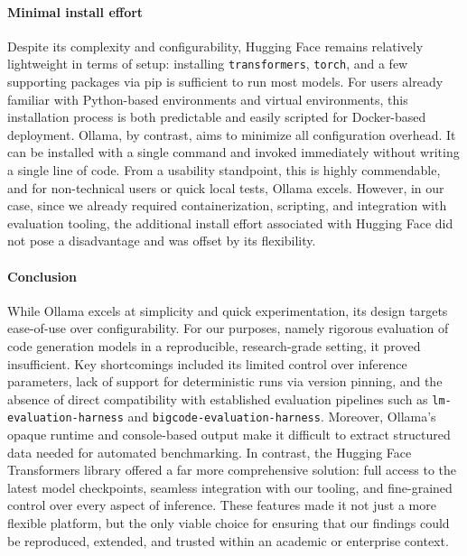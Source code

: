\paragraph{Minimal install effort}
Despite its complexity and configurability, Hugging Face remains relatively light\-weight in terms of setup: installing \texttt{transformers}, \texttt{torch}, and a few supporting packages via pip is sufficient to run most models. For users already familiar with Python-based environments and virtual environments, this installation process is both predictable and easily scripted for Docker-based deployment. Ollama, by contrast, aims to minimize all configuration overhead. It can be installed with a single command and invoked immediately without writing a single line of code. From a usability standpoint, this is highly commendable, and for non-technical users or quick local tests, Ollama excels. However, in our case, since we already required containerization, scripting, and integration with evaluation tooling, the additional install effort associated with Hugging Face did not pose a disadvantage and was offset by its flexibility.

\paragraph{Conclusion}
While Ollama excels at simplicity and quick experimentation, its design targets ease-of-use over configurability. For our purposes, namely rigorous evaluation of code generation models in a reproducible, research-grade setting, it proved insufficient. Key shortcomings included its limited control over inference parameters, lack of support for deterministic runs via version pinning, and the absence of direct compatibility with established evaluation pipelines such as \texttt{lm-evaluation-harness} and \texttt{bigcode-evaluation-harness}. Moreover, Ollama's opaque runtime and console-based output make it difficult to extract structured data needed for automated benchmarking. In contrast, the Hugging Face Transformers library offered a far more comprehensive solution: full access to the latest model checkpoints, seamless integration with our tooling, and fine-grained control over every aspect of inference. These features made it not just a more flexible platform, but the only viable choice for ensuring that our findings could be reproduced, extended, and trusted within an academic or enterprise context.

